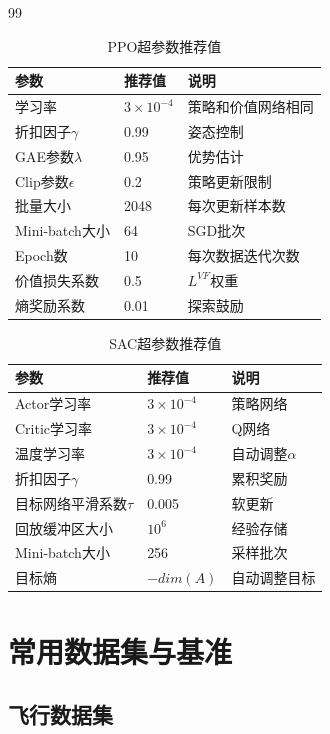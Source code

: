 \documentclass[12pt,a4paper]{ctexart}
\begin{document}
\begin{thebibliography}{99}
\begin{table}[htbp]
\centering
\caption{PPO超参数推荐值}\label{tab:ppo_params}
\begin{tabular}{@{}lll@{}}
\toprule
\textbf{参数} & \textbf{推荐值} & \textbf{说明} \\
\midrule
学习率 & $3\times10^{-4}$ & 策略和价值网络相同 \\
折扣因子$\gamma$ & 0.99 & 姿态控制 \\
GAE参数$\lambda$ & 0.95 & 优势估计 \\
Clip参数$\epsilon$ & 0.2 & 策略更新限制 \\
批量大小 & 2048 & 每次更新样本数 \\
Mini-batch大小 & 64 & SGD批次 \\
Epoch数 & 10 & 每次数据迭代次数 \\
价值损失系数 & 0.5 & $L^{VF}$权重 \\
熵奖励系数 & 0.01 & 探索鼓励 \\
\bottomrule
\end{tabular}
\end{table}

\begin{table}[htbp]
\centering
\caption{SAC超参数推荐值}\label{tab:sac_params}
\begin{tabular}{@{}lll@{}}
\toprule
\textbf{参数} & \textbf{推荐值} & \textbf{说明} \\
\midrule
Actor学习率 & $3\times10^{-4}$ & 策略网络 \\
Critic学习率 & $3\times10^{-4}$ & Q网络 \\
温度学习率 & $3\times10^{-4}$ & 自动调整$\alpha$ \\
折扣因子$\gamma$ & 0.99 & 累积奖励 \\
目标网络平滑系数$\tau$ & 0.005 & 软更新 \\
回放缓冲区大小 & $10^6$ & 经验存储 \\
Mini-batch大小 & 256 & 采样批次 \\
目标熵 & $-dim(A)$ & 自动调整目标 \\
\bottomrule
\end{tabular}
\end{table}

\section{常用数据集与基准}\label{app:datasets}

\subsection{飞行数据集}


\end{thebibliography}
\end{document}
